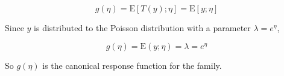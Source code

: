 \begin{answer}
	$$
	g(\eta) = \mathrm E[T(y);\eta] = \mathrm E[y;\eta]
	$$
	
	Since $y$ is distributed to the Poisson distribution with a parameter $\lambda=e^\eta$,
	
	$$
	g(\eta) = \mathrm E(y; \eta) = \lambda = e^\eta
	$$
	
	So $g(\eta)$ is the canonical response function for the family.
\end{answer}
